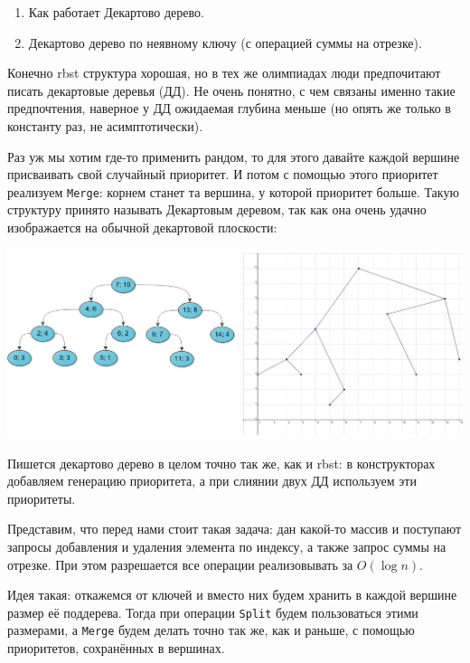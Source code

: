 \label{md2tex9}
\hyperref[md2texREADME]{\color{cyan}{К главному описанию}}


\begin{enumerate}
    \item Как работает Декартово дерево.
    \item Декартово дерево по неявному ключу (с операцией суммы на отрезке).
\end{enumerate}


Конечно rbst структура хорошая, но в тех же олимпиадах люди предпочитают писать декартовые деревья (ДД). Не очень понятно, с чем связаны именно такие предпочтения, наверное у ДД ожидаемая глубина меньше (но опять же только в константу раз, не асимптотически).


Раз уж мы хотим где-то применить рандом, то для этого давайте каждой вершине присваивать свой случайный приоритет. И потом с помощью этого приоритет реализуем \texttt{Merge}: корнем станет та вершина, у которой приоритет больше. Такую структуру принято называть Декартовым деревом, так как она очень удачно изображается на обычной декартовой плоскости:

\includegraphics[scale=0.4]{lessons/9-treap.png}

Пишется декартово дерево в целом точно так же, как и rbst: в конструкторах добавляем генерацию приоритета, а при слиянии двух ДД используем эти приоритеты.


Представим, что перед нами стоит такая задача: дан какой-то массив и поступают запросы добавления и удаления элемента по индексу, а также запрос суммы на отрезке. При этом разрешается все операции реализовывать за $O(\log n)$.

Идея такая: откажемся от ключей и вместо них будем хранить в каждой вершине размер её поддерева. Тогда при операции \texttt{Split} будем пользоваться этими размерами, а \texttt{Merge} будем делать точно так же, как и раньше, с помощью приоритетов, сохранённых в вершинах.

